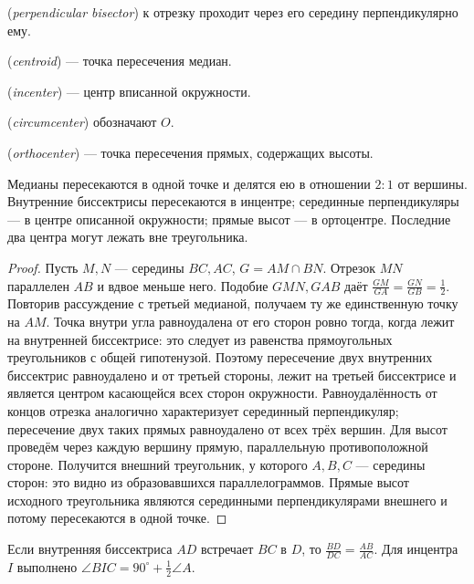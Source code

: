\begin{definition} (\emph{perpendicular bisector}) к отрезку проходит через его середину перпендикулярно ему.
\par{} (\emph{centroid}) — точка пересечения медиан.
\par{} (\emph{incenter}) — центр вписанной окружности.
\par{} (\emph{circumcenter}) обозначают \(O\).
\par{} (\emph{orthocenter}) — точка пересечения прямых, содержащих высоты.\end{definition}
\begin{theorem}\label{thm:exam-plane-centers}
Медианы пересекаются в одной точке и делятся ею в отношении \(2:1\) от вершины. Внутренние биссектрисы пересекаются в инцентре; серединные перпендикуляры — в центре описанной окружности; прямые высот — в ортоцентре. Последние два центра могут лежать вне треугольника.
\end{theorem}
\begin{proof}Пусть \(M,N\) — середины \(BC,AC\), \(G=AM\cap BN\). Отрезок \(MN\) параллелен \(AB\) и вдвое меньше него. Подобие \(GMN,GAB\) даёт \(\frac{GM}{GA}=\frac{GN}{GB}=\frac{1}{2}\). Повторив рассуждение с третьей медианой, получаем ту же единственную точку на \(AM\).
Точка внутри угла равноудалена от его сторон ровно тогда, когда лежит на внутренней биссектрисе: это следует из равенства прямоугольных треугольников с общей гипотенузой. Поэтому пересечение двух внутренних биссектрис равноудалено и от третьей стороны, лежит на третьей биссектрисе и является центром касающейся всех сторон окружности. Равноудалённость от концов отрезка аналогично характеризует серединный перпендикуляр; пересечение двух таких прямых равноудалено от всех трёх вершин.
Для высот проведём через каждую вершину прямую, параллельную противоположной стороне. Получится внешний треугольник, у которого \(A,B,C\) — середины сторон: это видно из образовавшихся параллелограммов. Прямые высот исходного треугольника являются серединными перпендикулярами внешнего и потому пересекаются в одной точке.\end{proof}
\begin{theorem}
Если внутренняя биссектриса \(AD\) встречает \(BC\) в \(D\), то \(\frac{BD}{DC}=\frac{AB}{AC}\). Для инцентра \(I\) выполнено \(\angle BIC=90^\circ+\frac{1}{2}\angle A\).
\end{theorem}
